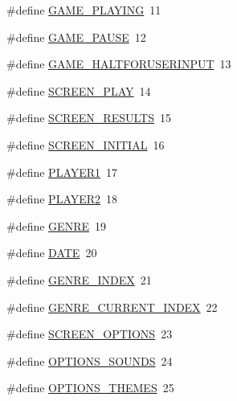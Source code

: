 \begin{DoxyCompactItemize}
\item 
\#define \hyperlink{_b_o_w-a_01film_01guessing_01game_8cpp_a80ec4a8c077821b335844529810fafb0}{G\+A\+M\+E\+\_\+\+P\+L\+A\+Y\+I\+N\+G}~11
\item 
\#define \hyperlink{_b_o_w-a_01film_01guessing_01game_8cpp_a703796878d6617a8b973f3446487fa85}{G\+A\+M\+E\+\_\+\+P\+A\+U\+S\+E}~12
\item 
\#define \hyperlink{_b_o_w-a_01film_01guessing_01game_8cpp_af14e3c0a9ccd116aca042880bf969811}{G\+A\+M\+E\+\_\+\+H\+A\+L\+T\+F\+O\+R\+U\+S\+E\+R\+I\+N\+P\+U\+T}~13
\item 
\#define \hyperlink{_b_o_w-a_01film_01guessing_01game_8cpp_a0a5f1eb3f9d32914cbd17c6319653442}{S\+C\+R\+E\+E\+N\+\_\+\+P\+L\+A\+Y}~14
\item 
\#define \hyperlink{_b_o_w-a_01film_01guessing_01game_8cpp_afe562eb24b0c0f049ffcf13b31a6d75b}{S\+C\+R\+E\+E\+N\+\_\+\+R\+E\+S\+U\+L\+T\+S}~15
\item 
\#define \hyperlink{_b_o_w-a_01film_01guessing_01game_8cpp_a5331f2f48cc2652a72c20bc4826946ed}{S\+C\+R\+E\+E\+N\+\_\+\+I\+N\+I\+T\+I\+A\+L}~16
\item 
\#define \hyperlink{_b_o_w-a_01film_01guessing_01game_8cpp_aff32b2add5186520b5ae86864ebaf51a}{P\+L\+A\+Y\+E\+R1}~17
\item 
\#define \hyperlink{_b_o_w-a_01film_01guessing_01game_8cpp_a7a2041512655fbd01e15d4516f7fb7cc}{P\+L\+A\+Y\+E\+R2}~18
\item 
\#define \hyperlink{_b_o_w-a_01film_01guessing_01game_8cpp_a6d46bdbd7001f1cf1618a9c1f554d51b}{G\+E\+N\+R\+E}~19
\item 
\#define \hyperlink{_b_o_w-a_01film_01guessing_01game_8cpp_a30b328ca499f27b3d0f8111b495834ca}{D\+A\+T\+E}~20
\item 
\#define \hyperlink{_b_o_w-a_01film_01guessing_01game_8cpp_a25e1e51a56fb864fa1c8a33a791c72bd}{G\+E\+N\+R\+E\+\_\+\+I\+N\+D\+E\+X}~21
\item 
\#define \hyperlink{_b_o_w-a_01film_01guessing_01game_8cpp_ae962b0235e2f69ad0f4cde780de67286}{G\+E\+N\+R\+E\+\_\+\+C\+U\+R\+R\+E\+N\+T\+\_\+\+I\+N\+D\+E\+X}~22
\item 
\#define \hyperlink{_b_o_w-a_01film_01guessing_01game_8cpp_ac633ae7413a1658f95c8c5e17ec7b1bd}{S\+C\+R\+E\+E\+N\+\_\+\+O\+P\+T\+I\+O\+N\+S}~23
\item 
\#define \hyperlink{_b_o_w-a_01film_01guessing_01game_8cpp_a6d1d5b20cac9afd87b2cbc5085e99d64}{O\+P\+T\+I\+O\+N\+S\+\_\+\+S\+O\+U\+N\+D\+S}~24
\item 
\#define \hyperlink{_b_o_w-a_01film_01guessing_01game_8cpp_afebc691dd16ecfb225b08b9ab866e579}{O\+P\+T\+I\+O\+N\+S\+\_\+\+T\+H\+E\+M\+E\+S}~25

\end{DoxyCompactItemize}
